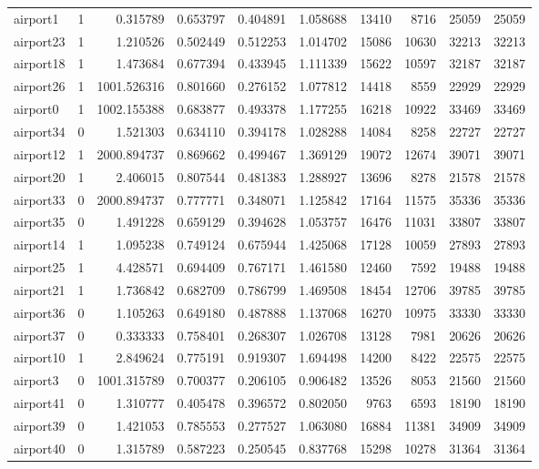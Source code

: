 \begin{longtable}{|l|r|r|r|r|r|r|r|r|r|}
airport1 & 1 & 0.315789 & 0.653797 & 0.404891 & 1.058688 & 13410 & 8716 & 25059 & 25059 \\
airport23 & 1 & 1.210526 & 0.502449 & 0.512253 & 1.014702 & 15086 & 10630 & 32213 & 32213 \\
airport18 & 1 & 1.473684 & 0.677394 & 0.433945 & 1.111339 & 15622 & 10597 & 32187 & 32187 \\
airport26 & 1 & 1001.526316 & 0.801660 & 0.276152 & 1.077812 & 14418 & 8559 & 22929 & 22929 \\
airport0 & 1 & 1002.155388 & 0.683877 & 0.493378 & 1.177255 & 16218 & 10922 & 33469 & 33469 \\
airport34 & 0 & 1.521303 & 0.634110 & 0.394178 & 1.028288 & 14084 & 8258 & 22727 & 22727 \\
airport12 & 1 & 2000.894737 & 0.869662 & 0.499467 & 1.369129 & 19072 & 12674 & 39071 & 39071 \\
airport20 & 1 & 2.406015 & 0.807544 & 0.481383 & 1.288927 & 13696 & 8278 & 21578 & 21578 \\
airport33 & 0 & 2000.894737 & 0.777771 & 0.348071 & 1.125842 & 17164 & 11575 & 35336 & 35336 \\
airport35 & 0 & 1.491228 & 0.659129 & 0.394628 & 1.053757 & 16476 & 11031 & 33807 & 33807 \\
airport14 & 1 & 1.095238 & 0.749124 & 0.675944 & 1.425068 & 17128 & 10059 & 27893 & 27893 \\
airport25 & 1 & 4.428571 & 0.694409 & 0.767171 & 1.461580 & 12460 & 7592 & 19488 & 19488 \\
airport21 & 1 & 1.736842 & 0.682709 & 0.786799 & 1.469508 & 18454 & 12706 & 39785 & 39785 \\
airport36 & 0 & 1.105263 & 0.649180 & 0.487888 & 1.137068 & 16270 & 10975 & 33330 & 33330 \\
airport37 & 0 & 0.333333 & 0.758401 & 0.268307 & 1.026708 & 13128 & 7981 & 20626 & 20626 \\
airport10 & 1 & 2.849624 & 0.775191 & 0.919307 & 1.694498 & 14200 & 8422 & 22575 & 22575 \\
airport3 & 0 & 1001.315789 & 0.700377 & 0.206105 & 0.906482 & 13526 & 8053 & 21560 & 21560 \\
airport41 & 0 & 1.310777 & 0.405478 & 0.396572 & 0.802050 & 9763 & 6593 & 18190 & 18190 \\
airport39 & 0 & 1.421053 & 0.785553 & 0.277527 & 1.063080 & 16884 & 11381 & 34909 & 34909 \\
airport40 & 0 & 1.315789 & 0.587223 & 0.250545 & 0.837768 & 15298 & 10278 & 31364 & 31364 \\

\end{longtable}

